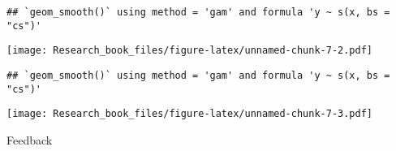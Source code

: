 \documentclass[]{book}
\newenvironment{Shaded}{\begin{snugshade}}{\end{snugshade}}
\newcommand{\KeywordTok}[1]{\textcolor[rgb]{0.13,0.29,0.53}{\textbf{#1}}}
\newcommand{\DataTypeTok}[1]{\textcolor[rgb]{0.13,0.29,0.53}{#1}}
\newcommand{\DecValTok}[1]{\textcolor[rgb]{0.00,0.00,0.81}{#1}}
\newcommand{\StringTok}[1]{\textcolor[rgb]{0.31,0.60,0.02}{#1}}
\newcommand{\OtherTok}[1]{\textcolor[rgb]{0.56,0.35,0.01}{#1}}
\newcommand{\OperatorTok}[1]{\textcolor[rgb]{0.81,0.36,0.00}{\textbf{#1}}}
\newcommand{\NormalTok}[1]{#1}
\theoremstyle{definition}
\theoremstyle{definition}
\theoremstyle{definition}
\theoremstyle{remark}
\begin{document}
\begin{Shaded}
\end{Shaded}

\begin{verbatim}
## `geom_smooth()` using method = 'gam' and formula 'y ~ s(x, bs = "cs")'
\end{verbatim}

\texttt{[image: Research\_book\_files/figure-latex/unnamed-chunk-7-2.pdf]}

\begin{Shaded}
\end{Shaded}

\begin{verbatim}
## `geom_smooth()` using method = 'gam' and formula 'y ~ s(x, bs = "cs")'
\end{verbatim}

\texttt{[image: Research\_book\_files/figure-latex/unnamed-chunk-7-3.pdf]}

Feedback
\end{document}

